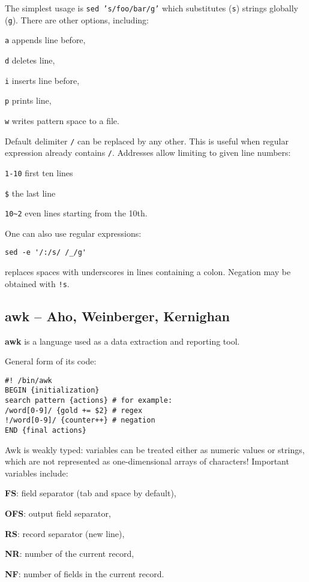The simplest usage is \texttt{sed 's/foo/bar/g'}
which substitutes (\texttt{s}) strings globally (\texttt{g}).
There are other options, including:
\begin{compactenum}
\item [\texttt{a}] appends line before,
\item [\texttt{d}] deletes line,
\item [\texttt{i}] inserts line before,
\item [\texttt{p}] prints line,
\item [\texttt{w}] writes pattern space to a file.
\end{compactenum}

Default delimiter \texttt{/} can be replaced by any other.
This is useful when regular expression already contains \texttt{/}.
Addresses allow limiting to given line numbers:
\begin{compactenum}
\item \texttt{1-10} first ten lines
\item \texttt{\$} the last line
\item \texttt{10\textasciitilde 2} even lines starting from the 10th.
\end{compactenum}

One can also use regular expressions:
\begin{verbatim}
sed -e '/:/s/ /_/g'
\end{verbatim}
replaces spaces with underscores in lines containing a colon.
Negation may be obtained with \texttt{!s}.


\subsection{awk -- Aho, Weinberger, Kernighan}
\begin{compactenum}
\item [\cmdvar] \textbf{awk} is a language used as a data extraction and reporting tool.
\end{compactenum}

General form of its code:
\begin{verbatim}
#! /bin/awk
BEGIN {initialization}
search pattern {actions} # for example:
/word[0-9]/ {gold += $2} # regex
!/word[0-9]/ {counter++} # negation
END {final actions}
\end{verbatim}

Awk is weakly typed: variables can be treated either as numeric values or strings, which are not represented as one-dimensional arrays of characters!
Important variables include:
\begin{compactenum}
\item \textbf{FS}: field separator (tab and space by default),
\item \textbf{OFS}: output field separator,
\item \textbf{RS}: record separator (new line),
\item \textbf{NR}: number of the current record,
\item \textbf{NF}: number of fields in the current record. 
\end{compactenum}

